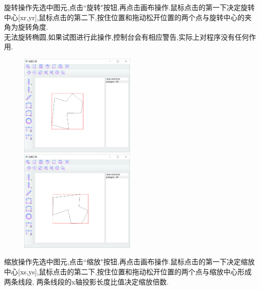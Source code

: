 \documentclass[a4paper,UTF8]{article}
\theoremstyle{definition}
\begin{document}
旋转操作先选中图元,点击``旋转"按钮,再点击画布操作.鼠标点击的第一下决定旋转中心[xr,yr],鼠标点击的第二下,按住位置和拖动松开位置的两个点与旋转中心的夹角为旋转角度.\\
\indent 无法旋转椭圆,如果试图进行此操作,控制台会有相应警告,实际上对程序没有任何作用.
\begin{figure}[H]
	\centering
	\begin{minipage}[t]{0.5\linewidth}
		\includegraphics[width=2.2in]{rotate1.png}
	\end{minipage}%
	\begin{minipage}[t]{0.5\linewidth}
		\includegraphics[width=2.2in]{rotate2.png}
	\end{minipage}
\end{figure}
缩放操作先选中图元,点击``缩放"按钮,再点击画布操作.鼠标点击的第一下决定缩放中心[xs,ys],鼠标点击的第二下,按住位置和拖动松开位置的两个点与缩放中心形成两条线段, 两条线段的x轴投影长度比值决定缩放倍数.
\end{document}
